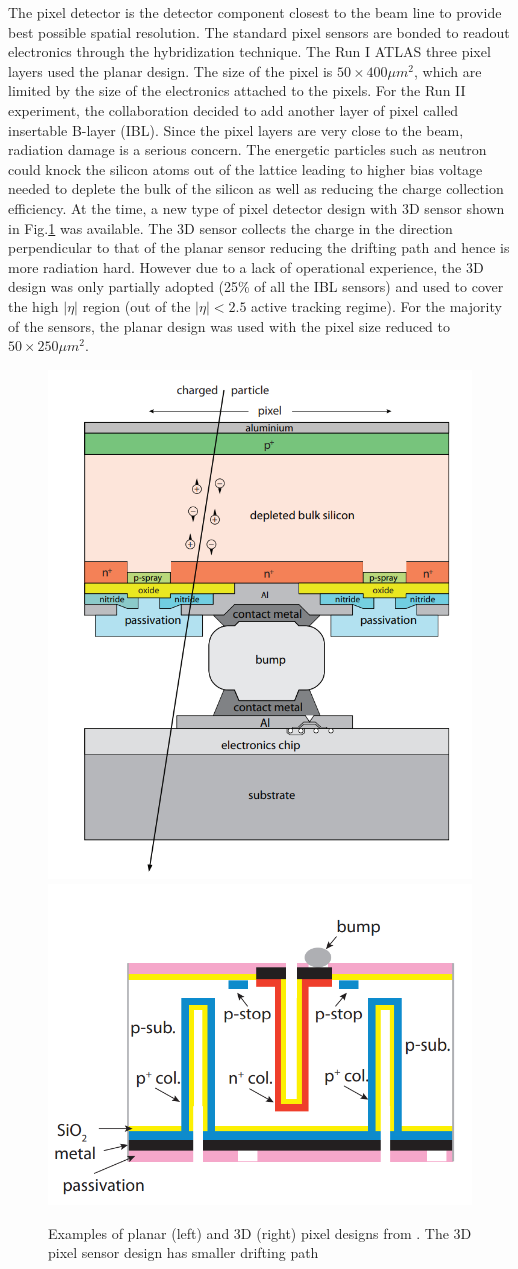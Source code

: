The pixel detector is the detector component closest to the beam line to provide best possible spatial resolution. The standard pixel sensors are bonded to readout electronics through the hybridization technique. The Run I ATLAS three pixel layers used the planar design. The size of the pixel is $50\times 400 \mu m^2$, which are limited by the size of the electronics attached to the pixels. For the Run II experiment, the collaboration decided to add another layer of pixel called insertable B-layer (IBL). Since the pixel layers are very close to the beam, radiation damage is a serious concern. The energetic particles such as neutron could knock the silicon atoms out of the lattice leading to higher bias voltage needed to deplete the bulk of the silicon as well as reducing the charge collection efficiency. At the time, a new type of pixel detector design with 3D sensor shown in Fig.\ref{fig:detector-sensor} was available. The 3D sensor collects the charge in the direction perpendicular to that of the planar sensor reducing the drifting path and hence is more radiation hard. However due to a lack of operational experience, the 3D design was only partially adopted (25\% of all the IBL sensors) and used to cover the high $|\eta|$ region (out of the $|\eta|<2.5$ active tracking regime). For the majority of the sensors, the planar design was used with the pixel size reduced to $50\times 250\mu m^2$. 

\begin{figure}[htpb!]
\begin{center}
  \includegraphics[width=0.35\linewidth]{figures/detector/PixelPlanar}
  \includegraphics[width=0.40\linewidth]{figures/detector/Pixel3D}
\caption{Examples of planar (left) and 3D (right) pixel designs from \cite{PixReview}. The 3D pixel sensor design has smaller drifting path }
\label{fig:detector-sensor}
\end{center}
\end{figure}



